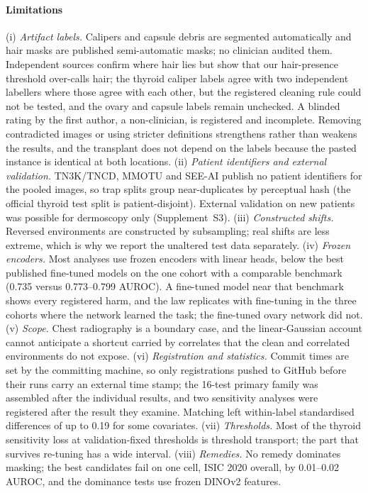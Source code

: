 \paragraph{Limitations}
(i) \emph{Artifact labels.} Calipers and capsule debris are segmented automatically and hair masks are published
semi-automatic masks; no clinician audited them. Independent sources confirm where hair lies but show that our
hair-presence threshold over-calls hair; the thyroid caliper labels agree with two independent labellers where those
agree with each other, but the registered cleaning rule could not be tested, and the ovary and capsule labels remain
unchecked. A blinded rating by the first author, a non-clinician, is registered and incomplete. Removing contradicted
images or using stricter definitions strengthens rather than weakens the results, and the transplant does not depend on
the labels because the pasted instance is identical at both locations.
(ii) \emph{Patient identifiers and external validation.} TN3K/TNCD, MMOTU and SEE-AI publish no patient identifiers for
the pooled images, so trap splits group near-duplicates by perceptual hash (the official thyroid test split is
patient-disjoint). External validation on new patients was possible for dermoscopy only (Supplement~S3).
(iii) \emph{Constructed shifts.} Reversed environments are constructed by subsampling; real shifts are less extreme,
which is why we report the unaltered test data separately.
(iv) \emph{Frozen encoders.} Most analyses use frozen encoders with linear heads, below the best published fine-tuned
models on the one cohort with a comparable benchmark (0.735 versus 0.773--0.799 AUROC). A fine-tuned model near that
benchmark shows every registered harm, and the law replicates with fine-tuning in the three cohorts where the network
learned the task; the fine-tuned ovary network did not.
(v) \emph{Scope.} Chest radiography is a boundary case, and the linear-Gaussian account cannot anticipate a shortcut
carried by correlates that the clean and correlated environments do not expose.
(vi) \emph{Registration and statistics.} Commit times are set by the committing machine, so only registrations pushed to
GitHub before their runs carry an external time stamp; the 16-test primary family was assembled after the individual
results, and two sensitivity analyses were registered after the result they examine. Matching left within-label
standardised differences of up to 0.19 for some covariates.
(vii) \emph{Thresholds.} Most of the thyroid sensitivity loss at validation-fixed thresholds is threshold transport; the
part that survives re-tuning has a wide interval.
(viii) \emph{Remedies.} No remedy dominates masking; the best candidates fail on one cell, ISIC 2020 overall, by
0.01--0.02 AUROC, and the dominance tests use frozen DINOv2 features.
